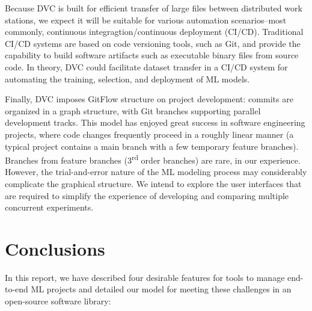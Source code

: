 \documentclass[10pt,sigconf, authordraft]{acmart}
\begin{document}
Because DVC is built for efficient transfer of large files between distributed work stations, we expect it will be suitable for various automation scenarios--most commonly, continuous integragtion/continuous deployment (CI/CD). Traditional CI/CD systems are based on code versioning tools, such as Git, and provide the capability to build software artifacts such as executable binary files from source code. In theory, DVC could facilitate dataset transfer in a CI/CD system for automating the training, selection, and deployment of ML models. 

Finally, DVC imposes GitFlow structure on project development: commits are organized in a graph structure, with Git branches supporting parallel development tracks. This model has enjoyed great success in software engineering projects, where code changes frequently proceed in a roughly linear manner (a typical project contains a main branch with a few temporary feature branches). Branches from feature branches (3\textsuperscript{rd} order branches) are rare, in our experience. However, the trial-and-error nature of the ML modeling process may considerably complicate the graphical structure. We intend to explore the user interfaces that are required to simplify the experience of developing and comparing multiple concurrent experiments.

\section{Conclusions}
In this report, we have described four desirable features for tools to manage end-to-end ML projects and detailed our model for meeting these challenges in an open-source software library:
\end{document}

